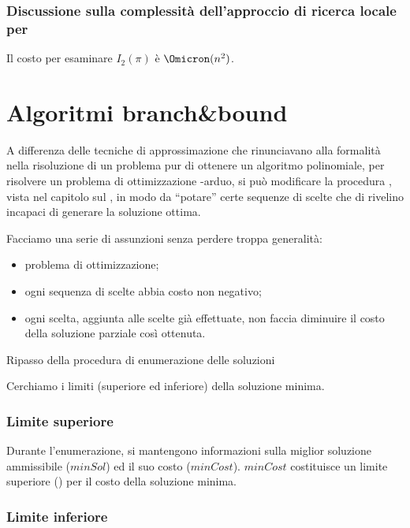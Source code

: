 \subsubsection{Discussione sulla complessità dell'approccio di ricerca locale per {\tsp}}

Il costo per esaminare \(I_2(\pi)\) è \(\Omicron(n^2)\).

\section{Algoritmi branch\&bound}

A differenza delle tecniche di approssimazione che rinunciavano alla formalità nella risoluzione di un problema pur di ottenere un algoritmo polinomiale, per risolvere un problema di ottimizzazione \NP-arduo, si può modificare la procedura \enumeration, vista nel capitolo sul , in modo da \enquote{potare} certe sequenze di scelte che di rivelino incapaci di generare la soluzione ottima.

Facciamo una serie di assunzioni senza perdere troppa generalità:
\begin{itemize}
	\item problema di ottimizzazione;
	\item ogni sequenza di scelte abbia costo non negativo;
	\item ogni scelta, aggiunta alle scelte già effettuate, non faccia diminuire il costo della soluzione parziale così ottenuta.
\end{itemize}

\begin{algorithm}[H]
	\caption{Ripasso della procedura di enumerazione delle soluzioni}
	
\end{algorithm}

Cerchiamo i limiti (superiore ed inferiore) della soluzione minima.

\subsubsection{Limite superiore}

Durante l'enumerazione, si mantengono informazioni sulla miglior soluzione ammissibile (\(minSol\)) ed il suo costo (\(minCost\)).
\(minCost\) costituisce un limite superiore () per il costo della soluzione minima.

\subsubsection{Limite inferiore}

